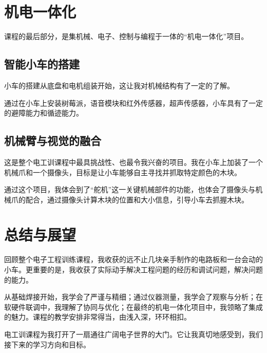 \documentclass[UTF8]{ctexart}
\begin{document}
\section{机电一体化}
课程的最后部分，是集机械、电子、控制与编程于一体的“机电一体化”项目。

\subsection{智能小车的搭建}
小车的搭建从底盘和电机组装开始，这让我对机械结构有了一定的了解。

通过在小车上安装树莓派，语音模块和红外传感器，超声传感器，小车具有了一定的避障能力和循迹能力。

\subsection{机械臂与视觉的融合}
这是整个电工训课程中最具挑战性、也最令我兴奋的项目。我在小车上加装了一个机械爪和一个摄像头，目标是让小车能够自主寻找并抓取特定颜色的木块。

通过这个项目，我体会到了“舵机”这一关键机械部件的功能，也体会了摄像头与机械爪的配合，通过摄像头计算木块的位置和大小信息，引导小车去抓握木块。

\section{总结与展望}
回顾整个电子工程训练课程，我收获的远不止几块亲手制作的电路板和一台会动的小车。更重要的是，我收获了实际动手解决工程问题的经历和调试问题，解决问题的能力。

从基础焊接开始，我学会了严谨与精细；通过仪器测量，我学会了观察与分析；在软硬件联调中，我理解了协同与优化；在最终的机电一体化项目中，我领略了集成的魅力。课程的教学安排非常得当，由浅入深，环环相扣。

电工训课程为我打开了一扇通往广阔电子世界的大门。它让我真切地感受到，我们接下来的学习方向和目标。
\end{document}
